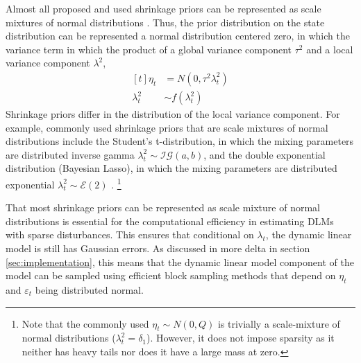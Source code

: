 \documentclass{article}
\newcommand{\dist}[1]{\mathcal{#1}}
\newcommand{\paren}[1]{\ensuremath{\left(#1\right)}}
\newcommand{\dinvgamma}[1]{\ensuremath{\dist{IG}\paren{#1}}}
\newcommand{\dexp}[1]{\ensuremath{\dist{E}\paren{#1}}}
\begin{document}
Almost all proposed and used shrinkage priors can be represented as scale mixtures of normal distributions \parencite{PolsonScott2010}.
Thus, the prior distribution on the state distribution can be represented a normal distribution centered zero, in which the variance term in which the product of a global variance component $\tau^{2}$ and a local variance component $\lambda^{2}$,
\begin{equation}
  \label{eq:3}
  \begin{aligned}[t]
    \eta_{t} &= N(0, \tau^{2} \lambda_{t}^{2}) \\
    \lambda_{t}^{2} &\sim f(\lambda_{t}^{2})
  \end{aligned}
\end{equation}
Shrinkage priors differ in the distribution of the local variance component.%
For example, commonly used shrinkage priors that are scale mixtures of normal distributions include the Student's t-distribution, in which the mixing parameters are distributed inverse gamma $\lambda^{2}_{t} \sim \dinvgamma{a, b}$, and the double exponential distribution (Bayesian Lasso), in which the mixing parameters are distributed exponential $\lambda^{2}_{t} \sim \dexp{2}$ \textcite[74]{CarvalhoPolsonScott2009}.
\footnote{
Note that the commonly used $\eta_{t} \sim N(0, Q)$ is trivially a scale-mixture of normal distributions ($\lambda_{t}^{2} = \delta_{1}$).
However, it does not impose sparsity as it neither has heavy tails nor does it have a large mass at zero.
}

That most shrinkage priors can be represented as scale mixture of normal distributions is essential for the computational efficiency in estimating DLMs with sparse disturbances.
This ensures that conditional on $\lambda_{t}$, the dynamic linear model is still has Gaussian errors.
As discussed in more delta in section \ref{sec:implementation}, this means that the dynamic linear model component of the model can be sampled using efficient block sampling methods that depend on $\eta_{t}$ and $\varepsilon_{t}$ being distributed normal.
\end{document}
